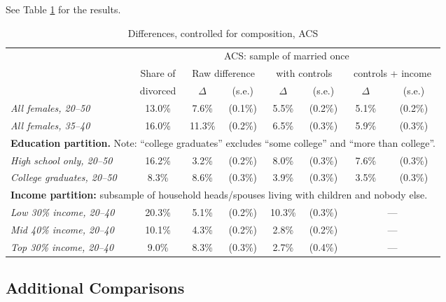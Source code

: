 \documentclass[12pt,letter]{article}
\begin{document}
See Table \ref{diff-contr} for the results. 

\begin{table}
\begin{center}
\begin{tabular}{|l|c||c|c|c|c|c|c|}\cline{2-8}
\multicolumn{1}{c|}{} & \multicolumn{7}{c|}{ACS: sample of married once}\\\cline{2-8}
\multicolumn{1}{c|}{} & \small Share of &\multicolumn{2}{c|}{\small Raw difference} & \multicolumn{2}{c|}{\small with controls} & \multicolumn{2}{c|}{\small controls + income} \\ \cline{3-8}
\multicolumn{1}{c|}{} & \small divorced & $\Delta$ & (s.e.) & $\Delta$ & (s.e.) & $\Delta$ & (s.e.) \\  \hline
\textit{All females, 20--50} & 13.0\% & 7.6\% & (0.1\%) & 5.5\% & (0.2\%) & 5.1\% & (0.2\%) \\
\textit{All females, 35--40} & 16.0\% & 11.3\% & (0.2\%) & 6.5\% & (0.3\%) & 5.9\% & (0.3\%) \\\hline\hline
\multicolumn{8}{|p{0.9\linewidth}|}{\footnotesize \textbf{Education partition.} Note: ``college graduates'' excludes ``some college'' and ``more than college''.}\\\hline
\textit{High school only, 20--50} & 16.2\% & 3.2\% & (0.2\%) & 8.0\% & (0.3\%) & 7.6\% & (0.3\%) \\
\textit{College graduates, 20--50} & 8.3\% & 8.6\% & (0.3\%) & 3.9\% & (0.3\%) & 3.5\% & (0.3\%) \\\hline\hline
\multicolumn{8}{|p{0.9\linewidth}|}{\footnotesize \textbf{Income partition:} subsample of household heads/spouses living with children and nobody else.}\\\hline
\textit{Low 30\% income, 20--40} & 20.3\% & 5.1\% & (0.2\%) & 10.3\% & (0.3\%) & \multicolumn{2}{c|}{---}\\
\textit{Mid 40\% income, 20--40} & 10.1\% & 4.3\% & (0.2\%) & 2.8\% & (0.2\%) & \multicolumn{2}{c|}{---}\\
\textit{Top 30\% income, 20--40} & 9.0\% & 8.3\% & (0.3\%) & 2.7\% & (0.4\%) & \multicolumn{2}{c|}{---}\\
\hline
\end{tabular}
\caption{Differences, controlled for composition, ACS\label{diff-contr}}
\end{center}
\end{table}
\subsection{Additional Comparisons}
\end{document}
